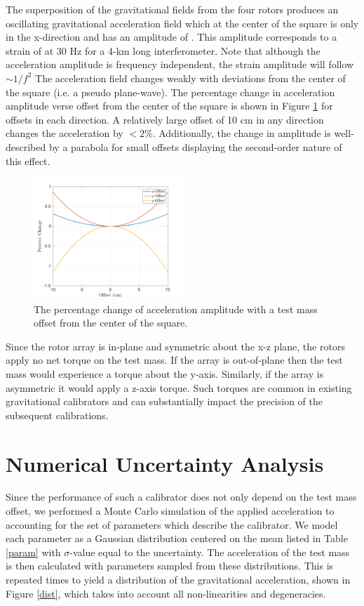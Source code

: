 \documentclass[superscriptaddress, twocolumn, prd]{revtex4-1}
\begin{document}
The superposition of the gravitational fields from the four rotors produces an oscillating gravitational acceleration field which at the center of the square is only in the x-direction and has an amplitude of . This amplitude corresponds to a strain of  at 30 Hz for a 4-km long interferometer. Note that although the acceleration amplitude is frequency independent, the strain amplitude will follow $\sim1/f^2$  The acceleration field changes weakly with deviations from the center of the square (i.e. a pseudo plane-wave). The percentage change in acceleration amplitude verse offset from the center of the square is shown in Figure \ref{offset} for offsets in each direction. A relatively large offset of 10 cm in any direction changes the acceleration by $<2\%$. Additionally, the change in amplitude is well-described by a parabola for small offsets displaying the second-order nature of this effect. 


\begin{figure}[!h]
\centering \includegraphics[width=0.5\textwidth]{Super4_Offset.pdf}
\caption{The percentage change of acceleration amplitude with a test mass offset from the center of the square.}
\label{offset} 
\end{figure}

Since the rotor array is in-plane and symmetric about the x-z plane, the rotors apply no net torque on the test mass. If the array is out-of-plane then the test mass would experience a torque about the y-axis. Similarly, if the array is asymmetric it would apply a z-axis torque. Such torques are common in existing gravitational calibrators and can substantially impact the precision of the subsequent calibrations.

\section{Numerical Uncertainty Analysis}

Since the performance of such a calibrator does not only depend on the test mass offset, we performed a Monte Carlo simulation of the applied acceleration to accounting for the set of parameters which describe the calibrator. We model each parameter as a Gaussian distribution centered on the mean listed in Table \ref{param} with $\sigma$-value equal to the uncertainty. The acceleration of the test mass is then calculated with parameters sampled from these distributions. This is repeated  times to yield a distribution of the gravitational acceleration, shown in Figure \ref{dist}, which takes into account all non-linearities and degeneracies. 
\end{document}
